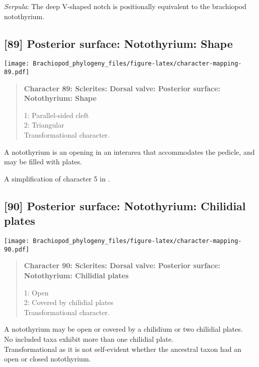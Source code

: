 \documentclass[openany]{book}
\theoremstyle{definition}
\theoremstyle{definition}
\theoremstyle{definition}
\theoremstyle{remark}
\begin{document}
\hypertarget{Serpula-coding-88}{}
\emph{Serpula}: The deep V-shaped notch \citep[fig. 8]{Schwabe2010} is
positionally equivalent to the brachiopod notothyrium.

\subsection*{{[}89{]} Posterior surface: Notothyrium:
Shape}\label{posterior-surface-notothyrium-shape}

\texttt{[image: Brachiopod\_phylogeny\_files/figure-latex/character-mapping-89.pdf]}

\begin{quote}
\textbf{Character 89: Sclerites: Dorsal valve: Posterior surface:
Notothyrium: Shape}

1: Parallel-sided cleft\\
2: Triangular\\
Transformational character.
\end{quote}

A notothyrium is an opening in an interarea that accommodates the
pedicle, and may be filled with plates.

A simplification of character 5 in
\citet{Bassett2001Functionalmorphology}.

\subsection*{{[}90{]} Posterior surface: Notothyrium: Chilidial
plates}\label{posterior-surface-notothyrium-chilidial-plates}

\texttt{[image: Brachiopod\_phylogeny\_files/figure-latex/character-mapping-90.pdf]}

\begin{quote}
\textbf{Character 90: Sclerites: Dorsal valve: Posterior surface:
Notothyrium: Chilidial plates}

1: Open\\
2: Covered by chilidial plates\\
Transformational character.
\end{quote}

A notothyrium may be open or covered by a chilidium or two chilidial
plates.\\
No included taxa exhibit more than one chilidial plate.\\
Transformational as it is not self-evident whether the ancestral taxon
had an open or closed notothyrium.
\end{document}
